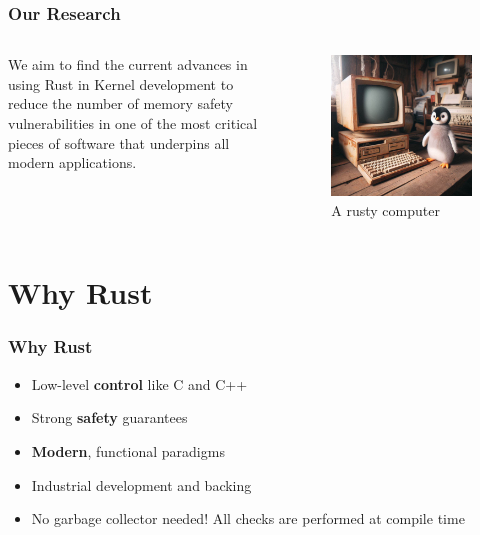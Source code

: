 \documentclass{beamer}
\begin{document}
\begin{frame}
  \frametitle{Our Research}
  \begin{columns}
    \begin{column}{0.5\textwidth}
      We aim to find the current advances in using Rust in Kernel development to reduce the number of
      memory safety vulnerabilities in one of the most critical pieces of software that underpins all
      modern applications.
    \end{column}
    \begin{column}{0.5\textwidth}
      \begin{figure}
        \caption{A rusty computer\footnotemark[1]}
        \includegraphics[width=.8\textwidth]{images/rusty.jpeg}\footnotemark[1]
      \end{figure}
    \end{column}
  \end{columns}
  \href{https://github.com/shanep/esem-2024/blob/master/proofs/esem24-50.pdf}{}
\end{frame}

\section{Why Rust}
\begin{frame}
  \frametitle{Why Rust}
  \begin{itemize}
  \item<1-> Low-level \textbf{control} like C and C++
  \item<2-> Strong \textbf{safety} guarantees
  \item<3-> \textbf{Modern}, functional paradigms
  \item<4-> Industrial development and backing
  \item<5-> No garbage collector needed! All checks are performed at compile time
  \end{itemize}
\end{frame}
\end{document}
